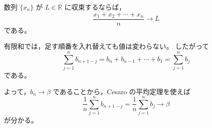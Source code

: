 \begin{background}
    \begin{lemma}
		数列 $\{x_n\}$ が $L\in\mathbb{R}$ に収束するならば，
        \[
            \frac{x_1+x_2+\cdots+x_n}{n}\to L
        \]
        である。
    \end{lemma}

    \begin{remark}
        有限和では，足す順番を入れ替えても値は変わらない。
        したがって
        \[
            \sum_{j=1}^{n}b_{n+1-j}
            =
            b_n+b_{n-1}+\cdots+b_1
            =
            \sum_{j=1}^{n}b_j
        \]
        である。

        よって，$b_n\to\beta$ であることから，Cesaro の平均定理を使えば
        \[
            \frac{1}{n}\sum_{j=1}^{n}b_{n+1-j}
            =
            \frac{1}{n}\sum_{j=1}^{n}b_j
            \to \beta
        \]
        が分かる。
    \end{remark}
\end{background}
